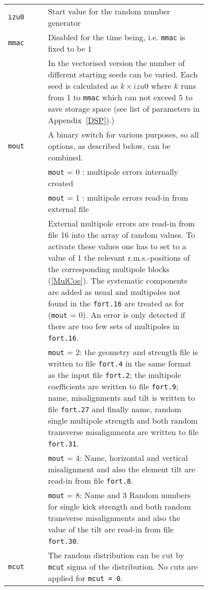 \bigskip
\begin{longtabu}{@{}lp{0.8\linewidth}}
    \texttt{izu0} & Start value for the random number generator \\
    \texttt{mmac} & \textcolor{notered}{Disabled for the time being, i.e. \texttt{mmac} is fixed to be 1} \\
                  & In the vectorised version the number of different starting seeds can be varied. Each seed is calculated as \mbox{$ k \times izu0 $} where $k$ runs from 1 to \texttt{mmac} which can not exceed 5 to save storage space (see    list of parameters in Appendix~\ref{DSP}).) \\
    \texttt{mout} & A binary switch for various purposes, so all options, as described below, can be combined. \\
                  & \texttt{mout} = 0 : multipole errors internally created \\
                  & \texttt{mout} = 1 : multipole errors read-in from external file \\
                  & External multipole errors are read-in from file 16 into the array of random values. To activate these values one has to set to a value of 1 the relevant r.m.s.-positions of the corresponding multipole blocks (\ref{MulCoe}). The systematic components are added as usual and multipoles not found in the \texttt{fort.16} are treated as for (\texttt{mout} = 0). An error is only detected if there are too few sets of multipoles in \texttt{fort.16}. \\
                  & \texttt{mout} = 2: the geometry and strength file is written to file \texttt{fort.4} in the same format as the input file \texttt{fort.2}; the multipole coefficients are written to file \texttt{fort.9}; name, misalignments and tilt is written to file \texttt{fort.27} and finally name, random single multipole  strength and both random transverse misalignments are written to file \texttt{fort.31}.\\
                  & \texttt{mout} = 4: Name, horizontal and vertical misalignment and also the element tilt are read-in from file \texttt{fort.8}.\\
                  & \texttt{mout} = 8: Name and 3 Random numbers for single kick strength and both random transverse misalignments and also the value of the tilt are read-in from file \texttt{fort.30}. \\
    \texttt{mcut} & The random distribution can be cut by \texttt{mcut} sigma of the distribution. No cuts are applied for \texttt{mcut = 0}.
\end{longtabu}

